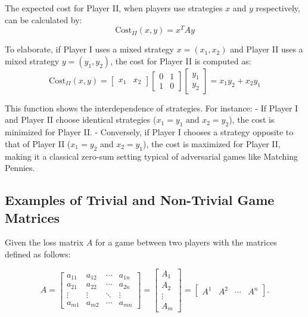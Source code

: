 \documentclass[11pt]{article}
\numberwithin{equation}{section}
\theoremstyle{boldStyle}
\begin{document}
The expected cost for Player II, when players use strategies \( x \) and \( y \) respectively, can be calculated by:
\begin{equation*} \label{eq:expected_cost}
    \text{Cost}_{II}(x, y) = x^T A y
\end{equation*}

To elaborate, if Player I uses a mixed strategy \( x = (x_1, x_2) \) and Player II uses a mixed strategy \( y = (y_1, y_2) \), the cost for Player II is computed as:
\begin{equation*}
    \text{Cost}_{II}(x, y) = \begin{bmatrix} x_1 & x_2 \end{bmatrix} \begin{bmatrix} 0 & 1 \\ 1 & 0 \end{bmatrix} \begin{bmatrix} y_1 \\ y_2 \end{bmatrix} = x_1 y_2 + x_2 y_1
\end{equation*}

This function shows the interdependence of strategies. For instance:
- If Player I and Player II choose identical strategies (\( x_1 = y_1 \) and \( x_2 = y_2 \)), the cost is minimized for Player II.
- Conversely, if Player I chooses a strategy opposite to that of Player II (\( x_1 = y_2 \) and \( x_2 = y_1 \)), the cost is maximized for Player II, making it a classical zero-sum setting typical of adversarial games like Matching Pennies.


\subsection{Examples of Trivial and Non-Trivial Game Matrices}

Given the loss matrix \( A \) for a game between two players with the matrices defined as follows:

\begin{equation*} \label{eq:3}
    A = \begin{bmatrix}
    a_{11} & a_{12} & \cdots & a_{1n} \\
    a_{21} & a_{22} & \cdots & a_{2n} \\
    \vdots & \vdots & \ddots & \vdots \\
    a_{m1} & a_{m2} & \cdots & a_{mn}
    \end{bmatrix} = \begin{bmatrix} A_1 \\ A_2 \\ \vdots \\ A_m \end{bmatrix} = \begin{bmatrix} A^1 & A^2 & \cdots & A^n \end{bmatrix}.
\end{equation*}
\end{document}
